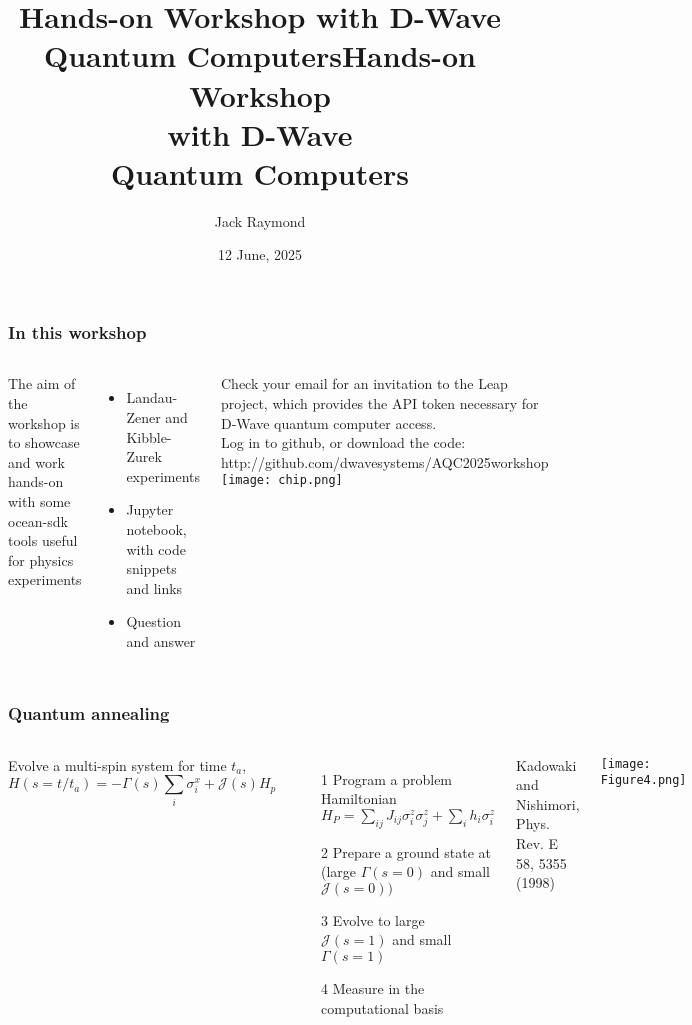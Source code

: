 \documentclass[aspectratio=169,final,11pt,forpublic]{beamer} %
\title{Hands-on Workshop with D-Wave Quantum Computers}
\date[2025]{12 June, 2025}
\author{Jack Raymond}
\begin{document}


  

\title{Hands-on Workshop \\ with D-Wave \\ Quantum Computers}
\maketitlering


\begin{frame}\frametitle{\bf In this workshop}
  \begin{columns}
    The aim of the workshop is to showcase and work hands-on with some ocean-sdk tools useful for physics experiments\\
    \begin{itemize}
    \item Landau-Zener and Kibble-Zurek experiments
    \item Jupyter notebook, with code snippets and links
    \item Question and answer
    \end{itemize}
    Check your email for an invitation to the Leap project, which provides the API token necessary for D-Wave quantum computer access.\\
    Log in to github, or download the code: http://github.com/dwavesystems/AQC2025workshop
    \texttt{[image: chip.png]}
  \end{columns}
\end{frame}

\begin{frame}\frametitle{\bf Quantum annealing}
  \begin{columns}
    \vspace{-0.2cm}
    Evolve a multi-spin system for time $t_a$, $$H(s=t/t_a) = -\Gamma(s) \sum_i \sigma^x_i + \mathcal{J}(s) H_p \nonumber $$
  \begin{itemize}
    \item[1] Program a problem Hamiltonian $H_P = \sum_{ij} J_{ij}\sigma^z_i \sigma^z_j + \sum_i h_i \sigma^z_i$
    \item[2] Prepare a ground state at (large $\Gamma(s=0)$ and small $\mathcal{J}(s=0))$
    \item[3] Evolve to large $\mathcal{J}(s=1)$ and small $\Gamma(s=1)$
    \item[4] Measure in the computational basis
  \end{itemize}
  Kadowaki and Nishimori, Phys. Rev. E 58, 5355 (1998)
  
  \texttt{[image: Figure4.png]}
\end{columns}
\end{frame}
\end{document}

